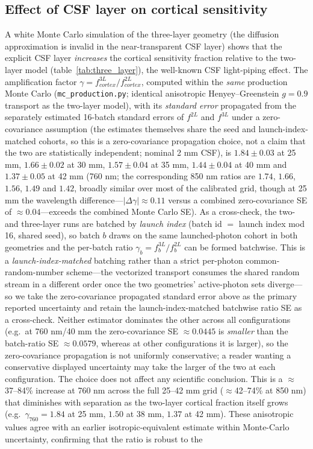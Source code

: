 \documentclass[11pt]{article}
\def\mathrm#1{#1}%
\def\,{ }%
\begin{document}
\subsection{Effect of CSF layer on cortical sensitivity}
\label{sec:csf_results}

A white Monte Carlo simulation of the three-layer geometry (the diffusion approximation is invalid in the near-transparent CSF layer) shows that the explicit CSF layer \textit{increases} the cortical sensitivity fraction relative to the two-layer model (table~\ref{tab:three_layer}), the well-known CSF light-piping effect. The amplification factor $\gamma = f_{\mathrm{cortex}}^{\mathrm{3L}}/f_{\mathrm{cortex}}^{\mathrm{2L}}$, computed within the \emph{same} production Monte Carlo (\texttt{mc\_production.py}; identical anisotropic Henyey--Greenstein $g=0.9$ transport as the two-layer model), with its \emph{standard error} propagated from the separately estimated 16-batch standard errors of $f^{\mathrm{2L}}$ and $f^{\mathrm{3L}}$ under a zero-covariance assumption (the estimates themselves share the seed and launch-index-matched cohorts, so this is a zero-covariance propagation choice, not a claim that the two are statistically independent; nominal 2\,mm CSF), is $1.84\pm0.03$ at 25\,mm, $1.66\pm0.02$ at 30\,mm, $1.57\pm0.04$ at 35\,mm, $1.44\pm0.04$ at 40\,mm and $1.37\pm0.05$ at 42\,mm (760\,nm; the corresponding 850\,nm ratios are $1.74$, $1.66$, $1.56$, $1.49$ and $1.42$, broadly similar over most of the calibrated grid, though at 25\,mm the wavelength difference---$|\Delta\gamma|\approx0.11$ versus a combined zero-covariance SE of $\approx0.04$---exceeds the combined Monte Carlo SE). As a cross-check, the two- and three-layer runs are batched by \emph{launch index} (batch id $=$ launch index mod 16, shared seed), so batch $b$ draws on the same launched-photon cohort in both geometries and the per-batch ratio $\gamma_b = f^{\mathrm{3L}}_b/f^{\mathrm{2L}}_b$ can be formed batchwise. This is a \emph{launch-index-matched} batching rather than a strict per-photon common-random-number scheme---the vectorized transport consumes the shared random stream in a different order once the two geometries' active-photon sets diverge---so we take the zero-covariance propagated standard error above as the primary reported uncertainty and retain the launch-index-matched batchwise ratio SE as a cross-check. Neither estimator dominates the other across all configurations (e.g.\ at 760\,nm/40\,mm the zero-covariance SE $\approx0.0445$ is \emph{smaller} than the batch-ratio SE $\approx0.0579$, whereas at other configurations it is larger), so the zero-covariance propagation is not uniformly conservative; a reader wanting a conservative displayed uncertainty may take the larger of the two at each configuration. The choice does not affect any scientific conclusion. This is a $\approx$37--84\% increase at 760\,nm across the full 25--42\,mm grid ($\approx$42--74\% at 850\,nm) that diminishes with separation as the two-layer cortical fraction itself grows (e.g.\ $\gamma_{760}=1.84$ at 25\,mm, $1.50$ at 38\,mm, $1.37$ at 42\,mm). These anisotropic values agree with an earlier isotropic-equivalent estimate within Monte-Carlo uncertainty, confirming that the ratio is robust to the 
\end{document}
